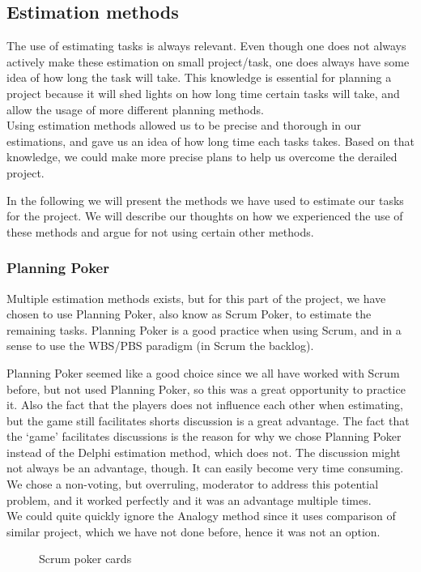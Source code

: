 \subsection{Estimation methods}
The use of estimating tasks is always relevant. Even though one does not always actively make these estimation on small project/task, one does always have some idea of how long the task will take. This knowledge is essential for planning a project because it will shed lights on how long time certain tasks will take, and allow the usage of more different planning methods.\\
Using estimation methods allowed us to be precise and thorough in our estimations, and gave us an idea of how long time each tasks takes. Based on that knowledge, we could make more precise plans to help us overcome the derailed project.

In the following we will present the methods we have used to estimate our tasks for the project. We will describe our thoughts on how we experienced the use of these methods and argue for not using certain other methods.
\subsubsection{Planning Poker}
Multiple estimation methods exists, but for this part of the project, we have chosen to use Planning Poker, also know as Scrum Poker, to estimate the remaining tasks. Planning Poker is a good practice when using Scrum, and in a sense to use the WBS/PBS paradigm (in Scrum the backlog).

Planning Poker seemed like a good choice since we all have worked with Scrum before, but not used Planning Poker, so this was a great opportunity to practice it. Also the fact that the players does not influence each other when estimating, but the game still facilitates shorts discussion is a great advantage. The fact that the `game' facilitates discussions is the reason for why we chose Planning Poker instead of the Delphi estimation method, which does not. The discussion might not always be an advantage, though. It can easily become very time consuming. We chose a non-voting, but overruling, moderator to address this potential problem, and it worked perfectly and it was an advantage multiple times.\\
We could quite quickly ignore the Analogy method since it uses comparison of similar project, which we have not done before, hence it was not an option.

\begin{figure}[H]
  \caption{Scrum poker cards}
  \label{scrumPokerCards}
\end{figure}


